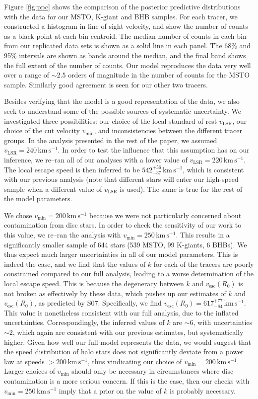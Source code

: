 \documentclass[useAMS,twocolumn,usenatbib]{mn2e}
\def\kms{{\,\mathrm{km\,s^{-1}}}}
\def\vesc{{v_\mathrm{esc}}}
\def\vmin{{v_\mathrm{min}}}
\begin{document}
Figure \ref{fig:ppc} shows the comparison of the posterior predictive distributions with the data for our MSTO, K-giant and BHB samples. 
For each tracer, we constructed a histogram in line of sight velocity, and show the number of counts as a black point at each bin centroid. 
The median number of counts in each bin from our replicated data sets is shown as a solid line in each panel.
The 68\% and 95\% intervals are shown as bands around the median, and the final band shows the full extent of the number of counts.  
Our model reproduces the data very well over a range of $\sim 2.5$ orders of magnitude in the number of counts for the MSTO sample. 
Similarly good agreement is seen for our other two tracers.

Besides verifying that the model is a good representation of the data, we also seek to understand some of the possible sources of systematic uncertainty.
We investigated three possibilities: our choice of the local standard of rest $v_\mathrm{LSR}$, our choice of the cut velocity $\vmin$, and inconsistencies between the different tracer groups.
In the analysis presented in the rest of the paper, we assumed $v_\mathrm{LSR} = 240\kms$. 
In order to test the influence that this assumption has on our inference, we re--ran all of our analyses with a lower value of $v_\mathrm{LSR} = 220\kms$.
The local escape speed is then inferred to be $542^{+56}_{-37}\kms$, which is consistent with our previous analysis (note that different stars will enter our high-speed sample when a different value of $v_\mathrm{LSR}$ is used). 
The same is true for the rest of the model parameters.

We chose $\vmin=200\kms$ because we were not particularly concerned about contamination from disc stars. 
In order to check the sensitivity of our work to this value, we re--ran the analysis with $\vmin = 250\kms$. 
This results in a significantly smaller sample of 644 stars (539 MSTO, 99 K-giants, 6 BHBs). 
We thus expect much larger uncertainties in all of our model parameters. 
This is indeed the case, and we find that the values of $k$ for each of the tracers are poorly constrained compared to our full analysis, leading to a worse determination of the local escape speed. 
This is because the degeneracy between $k$ and $\vesc(R_0)$ is not broken as effectively by these data, which pushes up our estimates of $k$ and $\vesc(R_0)$, as predicted by S07. 
Specifically, we find $\vesc(R_0) = 617^{+77}_{-84}\kms$.  
This value is nonetheless consistent with our full analysis, due to the inflated uncertainties. 
Correspondingly, the inferred values of $k$ are $\sim 6$, with uncertainties $\sim 2$, which again are consistent with our previous estimates, but systematically higher. 
Given how well our full model represents the data, we would suggest that the speed distribution of halo stars does not significantly deviate from a power law at speeds $>200\kms$, thus vindicating our choice of $\vmin = 200\kms$. 
Larger choices of $\vmin$ should only be necessary in circumstances where disc contamination is a more serious concern. 
If this is the case, then our checks with $\vmin = 250\kms$ imply that a prior on the value of $k$ is probably necessary.
\end{document}
